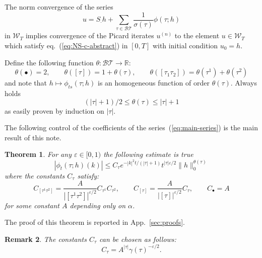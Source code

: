 \documentclass[a4paper,12pt,reqno]{amsart}
\newcommand{\1}{{\bf 1}}
\newcommand{\eps}{\varepsilon}
\newcommand{\RR}{\mathbb{R}}
\newtheorem{theorem}{Theorem}[section]
\newtheorem{remark}[theorem]{Remark}
\newcommand{\WW}{\mathcal{W}}
\newcommand{\BT}{\mathcal{BT}}
\newcommand{\troot}{\bullet}
\begin{document}
The norm convergence of the series
\begin{equation}
  \label{eq:main-series}
u =  S_{\cdot} h + \sum_{\tau \in \BT} \frac{1}{\sigma(\tau)} \phi(\tau;h)    
\end{equation}
in $\WW_T$ implies  convergence of the Picard iterates $u^{(n)}$ to the
element $u \in \WW_T$ which satisfy eq.~(\ref{eq:NS-c-abstract}) in
$[0,T]$ with
initial condition $u_0 = h$.


\bigskip

Define the following function $\theta : \BT \to \RR$:
\begin{equation*}
\theta(\troot) = 2, \qquad \theta([\tau]) = 1+ \theta(\tau), \qquad
\theta([\tau_1 \tau_2]) = \theta(\tau^1) + \theta(\tau^2)  
\end{equation*}
and note that $h \mapsto \phi_{ts}(\tau; h)$ is an homogeneous
function of order $\theta(\tau)$. Always holds
\begin{equation}
  \label{eq:theta-bound}
 (|\tau|+1)/2 \le
\theta(\tau) \le
|\tau|+1  
\end{equation}
 as easily proven by induction on $|\tau|$.

\bigskip
The following control of the coefficients of the series~(\ref{eq:main-series}) is the main result of this note.

\begin{theorem}
\label{th:main}
For any $\eps \in [0,1)$ the following estimate is true
\begin{equation*}
|\phi_{t}(\tau;h)(k)| \le C_{\tau} e^{-|k|^2 t / (|\tau|+1)}
t^{|\tau| \eps /2} \|h\|_0^{\theta(\tau)}  
\end{equation*}
where the constants $C_{\tau}$ satisfy:
$$
C_{[\tau^1 \tau^2]} = \frac{A}{|[\tau^1 \tau^2]|^{\eps/2}} C_{\tau^1} C_{\tau^2}, \qquad C_{[\tau]} = \frac{A}{|[\tau]|^{\eps/2}}
C_{\tau}, \qquad C_{\troot} = A
$$
for some constant $A$ depending only on $\alpha$. 
\end{theorem}
The proof of this theorem is reported in App.~\ref{sec:proofs}.



\begin{remark}
\label{rem:chooseC}
The constants $C_\tau$ can be chosen as follows:
$$
C_\tau = A^{|\tau|} \gamma(\tau)^{-\eps/2}.
$$  
\end{remark}
\end{document}
